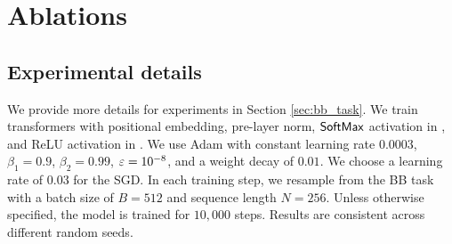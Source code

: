 \section{Ablations}
\label{sec:ablations}


\subsection{Experimental details}\label{appsec:experiment-detail}
We provide more details for experiments in Section \ref{sec:bb_task}. We train transformers with positional embedding, pre-layer norm, ${\sf SoftMax}$ activation in \attn, and ReLU activation in \mlp. 
We use Adam with constant learning rate $0.0003$, $\beta_1=0.9$, $\beta_2=0.99$, $\varepsilon=10^{-8}$, and a weight decay of $0.01$. We choose a learning rate of $0.03$ for the SGD. In each training step, we resample from the BB task with a batch size of $B=512$ and sequence length $N=256$. Unless otherwise specified, the model is trained for $10,000$ steps. Results are consistent across different random seeds.

